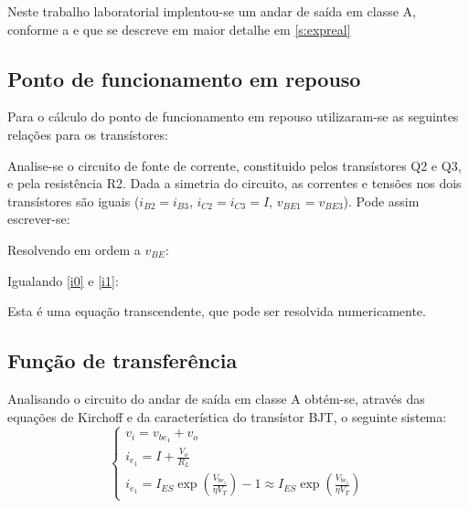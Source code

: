 \documentclass[%
  reprint,
  nofootinbib,
  amsmath,amssymb,
  aps,
  10pt,
  a4paper
]{revtex4-1}
\begin{document}

Neste trabalho laboratorial implentou-se um andar de saída em classe A, conforme a  e que se descreve em maior detalhe em \ref{s:expreal}

\subsection{Ponto de funcionamento em repouso}
Para o cálculo do ponto de funcionamento em repouso utilizaram-se as seguintes relações para os transístores:

Analise-se o circuito de fonte de corrente, constituido pelos transístores Q2 e Q3, e pela resistência R2. Dada a simetria do circuito, as correntes e tensões nos dois transístores são iguais ($i_{B2}=i_{B3}$, $i_{C2}=i_{C3}=I$, $v_{BE1}=v_{BE3}$). Pode assim escrever-se:

Resolvendo em ordem a $v_{BE}$:

Igualando \eqref{i0} e \eqref{i1}:

Esta é uma equação transcendente, que pode ser resolvida numericamente.

\subsection{Função de transferência}
Analisando o circuito do andar de saída em classe A obtém-se, através das equações de Kirchoff e da característica do transístor BJT, o seguinte sistema:
\begin{equation}
\begin{cases} v_i=v_{{be}_1}+v_o \\ i_{e_1}=I+\frac{V_o}{R_L}\\i_{e_1}=I_{ES}\exp \left(\frac{V_{{be}_1}}{\eta V_T}\right)-1\approx I_{ES}\exp \left(\frac{V_{{be}_1}}{\eta V_T}\right)
 \end{cases} 
\end{equation}
\end{document}
